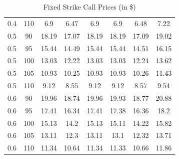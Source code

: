 \documentclass{article}
\begin{document}
\begin{table}[H]
\begin{tabular}{|c|c|c|c|c|c|c|c|}
  0.4 & 110 & 6.9 & 6.47 & 6.9 & 6.9 & 6.48 & 7.22 \\
  0.5 & 90 & 18.19 & 17.07 & 18.19 & 18.19 & 17.09 & 19.02 \\
  0.5 & 95 & 15.44 & 14.49 & 15.44 & 15.44 & 14.51 & 16.15 \\
  0.5 & 100 & 13.03 & 12.22 & 13.03 & 13.03 & 12.24 & 13.62 \\
  0.5 & 105 & 10.93 & 10.25 & 10.93 & 10.93 & 10.26 & 11.43 \\
  0.5 & 110 & 9.12 & 8.55 & 9.12 & 9.12 & 8.57 & 9.54 \\
  0.6 & 90 & 19.96 & 18.74 & 19.96 & 19.93 & 18.77 & 20.88 \\
  0.6 & 95 & 17.41 & 16.34 & 17.41 & 17.38 & 16.36 & 18.2 \\
  0.6 & 100 & 15.13 & 14.2 & 15.13 & 15.11 & 14.22 & 15.82 \\
  0.6 & 105 & 13.11 & 12.3 & 13.11 & 13.1 & 12.32 & 13.71 \\
  0.6 & 110 & 11.34 & 10.64 & 11.34 & 11.33 & 10.66 & 11.86 \\
  \hline
  \end{tabular}
  \caption{Fixed Strike Call Prices (in \$)}
  \label{table:name}
\end{table}
\end{document}
